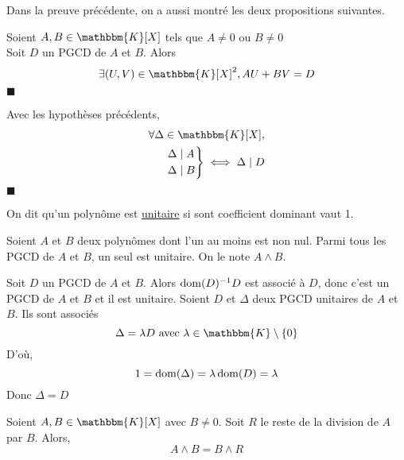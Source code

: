 \begin{rmk}
	Dans la preuve précédente, on a aussi montré les deux propositions suivantes.
\end{rmk}

\begin{thm}
	Soient $A,B \in \mathbbm{K}[X]$ tels que $A \neq 0$ ou $B \neq 0$ \\
	Soit $D$ un PGCD de $A$ et $B$. Alors \[
		\exists (U,V)\in \mathbbm{K}[X]^2, AU + BV = D
	\]
	\hfill $\blacksquare$
\end{thm}

\begin{prop}
	Avec les hypothèses précédents,
	\begin{align*}
		\forall \Delta \in \mathbbm{K}[X],\\
		\begin{rcases*}
			\Delta  \mid  A\\
			\Delta  \mid B
		\end{rcases*} \iff \Delta \mid D
	\end{align*}
	\hfill $\blacksquare$
\end{prop}

\begin{defn}
	On dit qu'un polynôme est \underline{unitaire} si sont coefficient dominant vaut 1.
\end{defn}

\begin{prop-defn}
	Soient $A$ et $B$ deux polynômes dont l'un au moins est non nul. Parmi tous les PGCD de $A$ et $B$, un seul est unitaire. On le note $A \wedge B$.
\end{prop-defn}

\begin{prv}
	Soit $D$ un PGCD de $A$ et $B$. Alors $\operatorname*{dom}(D)^{-1}D$ est associé à $D$, donc c'est un PGCD de $A$ et $B$ et il est unitaire. Soient $D$ et $\Delta$ deux PGCD unitaires de $A$ et $B$. Ils sont associés \[
		\Delta = \lambda D \text{ avec } \lambda \in \mathbbm{K}\setminus \{0\}
	\] D'où, \[
		1 = \operatorname*{dom}(\Delta) = \lambda \operatorname*{dom}(D) = \lambda
	\] Donc $\Delta = D$
\end{prv}

\begin{prop}
	Soient $A,B \in \mathbbm{K}[X]$ avec $B \neq 0$. Soit $R$ le reste de la division de $A$ par $B$. Alors, \[
		A \wedge B = B \wedge R
	\] 
\end{prop}

\begin{prv}
\end{prv}

